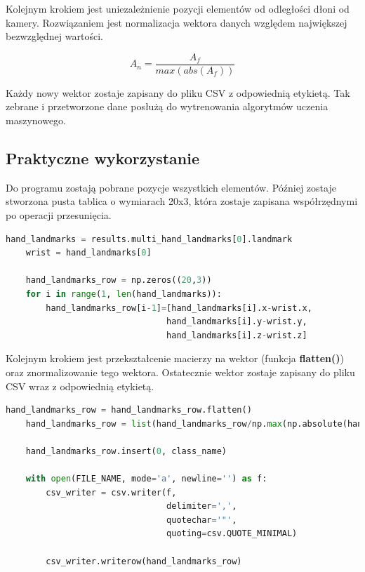 \quad Kolejnym krokiem jest uniezależnienie pozycji elementów od odległości dłoni od kamery. Rozwiązaniem jest normalizacja wektora danych względem największej bezwzględnej wartości. 

\begin{equation}
    A_n=\dfrac{A_f}{max(abs(A_f))}
\end{equation}

\quad Każdy nowy wektor zostaje zapisany do pliku CSV z odpowiednią etykietą. Tak zebrane i przetworzone dane posłużą do wytrenowania algorytmów uczenia maszynowego.

\newpage
\subsection{Praktyczne wykorzystanie}

\quad Do programu zostają pobrane pozycje wszystkich elementów. Później zostaje stworzona pusta tablica o wymiarach 20x3, która zostaje zapisana współrzędnymi po operacji przesunięcia. \newline

\begin{lstlisting}[language=python, style=programming, captionpos=b, caption={Funkcja zwracająca rozpoznany gest}]
    hand_landmarks = results.multi_hand_landmarks[0].landmark
    wrist = hand_landmarks[0]

    hand_landmarks_row = np.zeros((20,3))
    for i in range(1, len(hand_landmarks)):
        hand_landmarks_row[i-1]=[hand_landmarks[i].x-wrist.x, 
                                hand_landmarks[i].y-wrist.y, 
                                hand_landmarks[i].z-wrist.z]
\end{lstlisting}

\quad Kolejnym krokiem jest przekształcenie macierzy na wektor (funkcja \textbf{flatten()}) oraz znormalizowanie tego wektora. Ostatecznie wektor zostaje zapisany do pliku CSV wraz z odpowiednią etykietą. \newline

\begin{lstlisting}[language=python, style=programming, captionpos=b, caption={Funkcja zwracająca rozpoznany gest}]
    hand_landmarks_row = hand_landmarks_row.flatten()
    hand_landmarks_row = list(hand_landmarks_row/np.max(np.absolute(hand_landmarks_row)))
    
    hand_landmarks_row.insert(0, class_name)
    
    with open(FILE_NAME, mode='a', newline='') as f:
        csv_writer = csv.writer(f, 
                                delimiter=',', 
                                quotechar='"', 
                                quoting=csv.QUOTE_MINIMAL)

        csv_writer.writerow(hand_landmarks_row)
\end{lstlisting}

